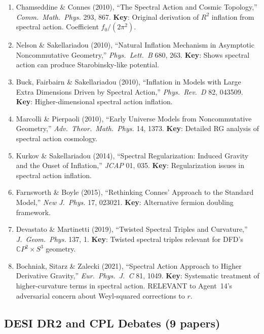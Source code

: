 \documentclass[11pt,a4paper]{article}
\newcommand{\CP}{\mathbb{C}P}
\begin{document}
\begin{enumerate}
\item Chamseddine \& Connes (2010), ``The Spectral Action and Cosmic Topology,'' \textit{Comm.\ Math.\ Phys.} 293, 867. \textbf{Key}: Original derivation of $R^2$ inflation from spectral action. Coefficient $f_0/(2\pi^2)$.

\item Nelson \& Sakellariadou (2010), ``Natural Inflation Mechanism in Asymptotic Noncommutative Geometry,'' \textit{Phys.\ Lett.\ B} 680, 263. \textbf{Key}: Shows spectral action can produce Starobinsky-like potential.

\item Buck, Fairbairn \& Sakellariadou (2010), ``Inflation in Models with Large Extra Dimensions Driven by Spectral Action,'' \textit{Phys.\ Rev.\ D} 82, 043509. \textbf{Key}: Higher-dimensional spectral action inflation.

\item Marcolli \& Pierpaoli (2010), ``Early Universe Models from Noncommutative Geometry,'' \textit{Adv.\ Theor.\ Math.\ Phys.} 14, 1373. \textbf{Key}: Detailed RG analysis of spectral action cosmology.

\item Kurkov \& Sakellariadou (2014), ``Spectral Regularization: Induced Gravity and the Onset of Inflation,'' \textit{JCAP} 01, 035. \textbf{Key}: Regularization issues in spectral action inflation.

\item Farnsworth \& Boyle (2015), ``Rethinking Connes' Approach to the Standard Model,'' \textit{New J.\ Phys.} 17, 023021. \textbf{Key}: Alternative fermion doubling framework.

\item Devastato \& Martinetti (2019), ``Twisted Spectral Triples and Curvature,'' \textit{J.\ Geom.\ Phys.} 137, 1. \textbf{Key}: Twisted spectral triples relevant for DFD's $\CP^2 \times S^3$ geometry.

\item Bochniak, Sitarz \& Zalecki (2021), ``Spectral Action Approach to Higher Derivative Gravity,'' \textit{Eur.\ Phys.\ J.\ C} 81, 1049. \textbf{Key}: Systematic treatment of higher-curvature terms in spectral action. RELEVANT to Agent~14's adversarial concern about Weyl-squared corrections to $r$.
\end{enumerate}

\subsection{DESI DR2 and CPL Debates (9 papers)}
\end{document}

